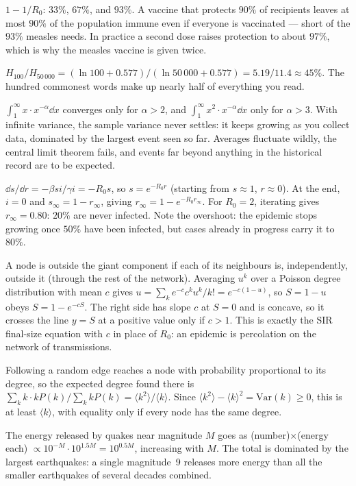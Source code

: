 
 $1-1/R_0$: $33\%$, $67\%$, and $93\%$. A vaccine that protects $90\%$ of recipients leaves at most $90\%$ of the population immune even if everyone is vaccinated --- short of the $93\%$ measles needs. In practice a second dose raises protection to about $97\%$, which is why the measles vaccine is given twice.

 $H_{100}/H_{50\,000} = (\ln100 + 0.577)/(\ln50\,000 + 0.577) = 5.19/11.4\approx45\%$. The hundred commonest words make up nearly half of everything you read.

 $\int_1^\infty x\cdot x^{-\alpha}\dd x$ converges only for $\alpha>2$, and $\int_1^\infty x^2\cdot x^{-\alpha}\dd x$ only for $\alpha>3$. With infinite variance, the sample variance never settles: it keeps growing as you collect data, dominated by the largest event seen so far. Averages fluctuate wildly, the central limit theorem fails, and events far beyond anything in the historical record are to be expected.

 $\dd s/\dd r = -\beta si/\gamma i = -R_0s$, so $s = e^{-R_0r}$ (starting from $s\approx1$, $r\approx0$). At the end, $i = 0$ and $s_\infty = 1 - r_\infty$, giving $r_\infty = 1 - e^{-R_0r_\infty}$. For $R_0 = 2$, iterating gives $r_\infty = 0.80$: $20\%$ are never infected. Note the overshoot: the epidemic stops growing once $50\%$ have been infected, but cases already in progress carry it to $80\%$.

 A node is outside the giant component if each of its neighbours is, independently, outside it (through the rest of the network). Averaging $u^k$ over a Poisson degree distribution with mean $c$ gives $u = \sum_ke^{-c}c^ku^k/k! = e^{-c(1-u)}$, so $S = 1-u$ obeys $S = 1 - e^{-cS}$. The right side has slope $c$ at $S = 0$ and is concave, so it crosses the line $y = S$ at a positive value only if $c>1$. This is exactly the SIR final-size equation with $c$ in place of $R_0$: an epidemic is percolation on the network of transmissions.

 Following a random edge reaches a node with probability proportional to its degree, so the expected degree found there is $\sum_kk\cdot kP(k)/\sum_kkP(k) = \langle k^2\rangle/\langle k\rangle$. Since $\langle k^2\rangle - \langle k\rangle^2 = \mathrm{Var}(k)\ge0$, this is at least $\langle k\rangle$, with equality only if every node has the same degree.

 The energy released by quakes near magnitude $M$ goes as (number)$\times$(energy each) $\propto10^{-M}\cdot10^{1.5M} = 10^{0.5M}$, increasing with $M$. The total is dominated by the largest earthquakes: a single magnitude~9 releases more energy than all the smaller earthquakes of several decades combined.


